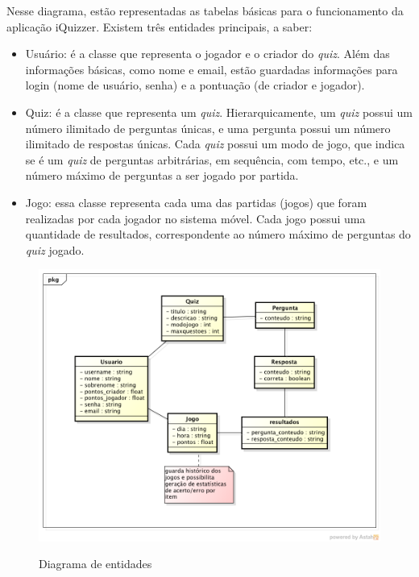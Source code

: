         Nesse diagrama, estão representadas as tabelas básicas para o funcionamento da aplicação iQuizzer. Existem três entidades principais, a saber:
\begin{itemize}
\item Usuário: é a classe que representa o jogador e o criador do \emph{quiz}. Além das informações básicas, como nome e email, estão guardadas informações para login (nome de usuário, senha) e a pontuação (de criador e jogador).
\item Quiz: é a classe que representa um \emph{quiz}. Hierarquicamente, um \emph{quiz} possui um número ilimitado de perguntas únicas, e uma pergunta possui um número ilimitado de respostas únicas. Cada \emph{quiz} possui um modo de jogo, que indica se é um \emph{quiz} de perguntas arbitrárias, em sequência, com tempo, etc., e um número máximo de perguntas a ser jogado por partida.
\item Jogo: essa classe representa cada uma das partidas (jogos) que foram realizadas por cada jogador no sistema móvel. Cada jogo possui uma quantidade de resultados, correspondente ao número máximo de perguntas do \emph{quiz} jogado.
\end{itemize} 
 
\begin{figure}[H]
  \centering
  \includegraphics[scale =0.55]{figs/MER_web.png}\\
  \caption{ Diagrama de entidades }
  \label{FIG:Form_Factor2}
\end{figure}
